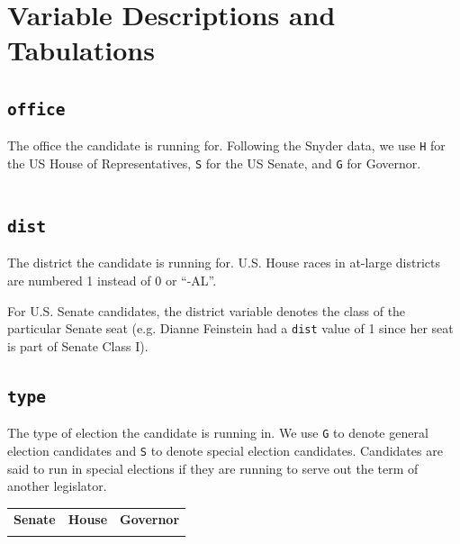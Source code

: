 \documentclass[12pt]{article}
\begin{document}
\section{Variable Descriptions and Tabulations}



\subsection*{\texttt{office}}

The office the candidate is running for. Following the Snyder data, we use \texttt{H} for the US House of Representatives, \texttt{S} for the US Senate, and \texttt{G} for Governor.


    \begin{tabularx}{\linewidth}{C}
    
    \end{tabularx}

\subsection*{\texttt{dist}}

The district the candidate is running for. U.S. House races in at-large districts are numbered 1 instead of 0 or ``-AL''.

 For U.S. Senate candidates, the district variable denotes the class of the particular Senate seat (e.g. Dianne Feinstein had a \texttt{dist} value of 1 since her seat is part of Senate Class I).

\begin{table}[!h]
\centering
\footnotesize

\end{table}





\subsection*{\texttt{type}}

The type of election the candidate is running in. We use \texttt{G} to denote general election candidates and \texttt{S} to denote special election candidates. Candidates are said to run in special elections if they are running to serve out the term of another legislator.
\begin{table}[!h]
\begin{tabularx}{\linewidth}{CCC}
    \textbf{Senate} & \textbf{House} & \textbf{Governor}\\
     &  & 
\end{tabularx}
\end{table}
\end{document}

